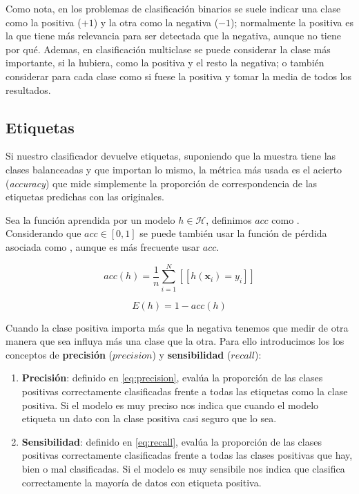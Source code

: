 Como nota, en los problemas de clasificación binarios se suele indicar una clase como la positiva ($+1$) y la otra como la negativa ($-1$); normalmente la positiva es la que tiene más relevancia para ser detectada que la negativa, aunque no tiene por qué. Ademas, en clasificación multiclase se puede considerar la clase más importante, si la hubiera, como la positiva y el resto la negativa; o también considerar para cada clase como si fuese la positiva y tomar la media de todos los resultados.

\subsection{Etiquetas}

Si nuestro clasificador devuelve etiquetas, suponiendo que la muestra tiene las clases balanceadas y que importan lo mismo, la métrica más usada es el acierto (\emph{accuracy}) que mide simplemente la proporción de correspondencia de las etiquetas predichas con las originales.

Sea la función aprendida por un modelo $h \in \mathcal{H}$, definimos $acc$ como . Considerando que $acc \in [0, 1]$ se puede también usar la función de pérdida asociada como , aunque es más frecuente usar $acc$.

\begin{equation}
  acc(h) = \frac{1}{n} \sum \limits^N_{i = 1}[[h(\textbf{x}_i) = y_i]]
  \label{eq:acc}
\end{equation}

\begin{equation}
  E(h) = 1 - acc(h)
  \label{eq:acc_loss}
\end{equation}

Cuando la clase positiva importa más que la negativa tenemos que medir de otra manera que sea influya más una clase que la otra. Para ello introducimos los los conceptos de \textbf{precisión} ($precision$) y \textbf{sensibilidad} ($recall$):

\begin{enumerate}
  \item \textbf{Precisión}: definido en \eqref{eq:precision}, evalúa la proporción de las clases positivas correctamente clasificadas frente a todas las etiquetas como la clase positiva. Si el modelo es muy preciso nos indica que cuando el modelo etiqueta un dato con la clase positiva casi seguro que lo sea.
  \item \textbf{Sensibilidad}: definido en \eqref{eq:recall}, evalúa la proporción de las clases positivas correctamente clasificadas frente a todas las clases positivas que hay, bien o mal clasificadas. Si el modelo es muy sensibile nos indica que clasifica correctamente la mayoría de datos con etiqueta positiva.
\end{enumerate}

